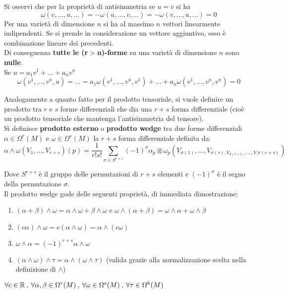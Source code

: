 Si osservi che per la proprietà di antisimmetria se $u = v$ si ha
$$\omega(v,\dots,u,\dots) = - \omega(u,\dots,v,\dots) = - \omega(v,\dots,u,\dots) = 0$$
Per una varietà di dimensione $n$ si ha al massimo $n$ vettori linearmente indipendenti.
Se si prende in considerazione un vettore aggiuntivo, esso è combinazione lineare dei precedenti.\\
Di conseguenza \textbf{tutte le (r$>$n)-forme} su una varietà di dimensione $n$ sono \textbf{nulle}.\\
Se $u= a_1v^1 + \dots + a_nv^n$
$$
   \omega(v^1,\dots,v^n,u) = \dots = a_1\omega(v^1,\dots,v^n,v^1) + \dots
      + a_n\omega(v^1,\dots,v^n,v^n) = 0
$$

Analogamente a quanto fatto per il prodotto tensoriale, si vuole definire un prodotto
tra $r$ e $s$ forme differenziali che dia una $r+s$ forma differenziale (cioè un
prodotto tensoriale che mantenga l'antisimmetria del tensore).\\

Si definisce \textbf{prodotto esterno} o \textbf{prodotto wedge} tra due forme
differenziali $\alpha \in \Omega^r(M)$ e $\omega \in \Omega^s(M)$ la $r+s$ forma
differenziale definita da:
$$
   \alpha \wedge \omega (V_1,\dots,V_{r+s})(p) =
   \frac{1}{r!s!}\sum_{\sigma \in S^{r+s} } (-1)^\sigma
   \alpha_p\otimes\omega_p (V_{\sigma(1)}, \dots , V_{\sigma(r),
      V_{\sigma(r+1)}, \dots , V_,\sigma(r+s)})
$$

Dove $S^{r+s}$ è il gruppo delle permutazioni di $r+s$ elementi e $(-1)^\sigma$
è il segno della permutazione $\sigma$.\\

Il prodotto wedge gode delle seguenti proprietà, di immediata dimostrazione:

\begin{enumerate}
    \item $(\alpha + \beta) \wedge \omega = \alpha\wedge\omega + \beta\wedge\omega$ e
          $\omega \wedge(\alpha + \beta)  = \omega\wedge\alpha + \omega\wedge\beta$
    \item $(c\alpha)\wedge\omega = c(\alpha\wedge\omega) = \alpha\wedge(c\omega)$
    \item $\omega\wedge\alpha = (-1)^{r+s} \alpha\wedge\omega$
    \item $(\alpha\wedge\omega)\wedge\tau = \alpha\wedge(\omega\wedge\tau)$
       (valida grazie alla normalizzazione scelta nella definizione di $\wedge$)
\end{enumerate}
$
   \forall c\in \mathbb{R} \: , \:
   \forall \alpha,\beta \in \Omega^r(M) \: , \:
   \forall \omega \in \Omega^s(M) \: , \:
   \forall \tau \in \Omega^k(M)
$\\

